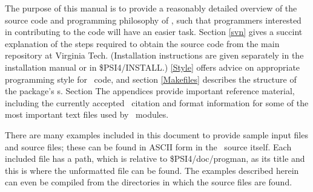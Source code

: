 The purpose of this manual is to provide a reasonably detailed
overview of the source code and programming philosophy of \PSIfour,
such that programmers interested in contributing to the code will have
an easier task.  Section \ref{svn} gives a succint explanation of the
steps required to obtain the source code from the main repository at
Virginia Tech.  (Installation instructions are given separately in the
installation manual or in \$PSI4/INSTALL.) \ref{Style} offers advice on
appropriate programming style for \PSIfour\ code, and section \ref{Makefiles}
describes the structure of the package's s.  Section
The appendices provide important reference material,
including the currently accepted \PSIfour\ citation and format
information for some of the most important text files used by
\PSIfour\ modules.

There are many examples included in this document to provide sample input files
and source files; these can be found in ASCII form in the \PSIfour\ source
itself.  Each included file has a path, which is relative to
\$PSI4/doc/progman, as its title and this is where the unformatted file can be
found.  The examples described herein can even be compiled from the directories
in which the source files are found.
